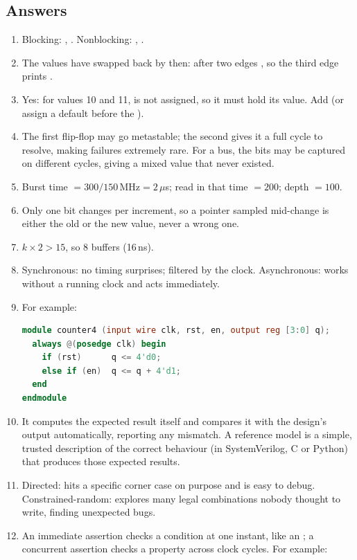 \subsection*{Answers}
\begin{enumerate}
  \item Blocking: , . Nonblocking: , .
  \item The values have swapped back by then: after two edges , so the third edge prints .
  \item Yes: for  values 10 and 11,  is not assigned, so it must hold its value. Add  (or assign  a default before the ).
  \item The first flip-flop may go metastable; the second gives it a full cycle to resolve, making failures extremely rare. For a bus, the bits may be captured on different cycles, giving a mixed value that never existed.
  \item Burst time $= 300/150\,\text{MHz} = 2\,\mu$s; read in that time $= 200$; depth $= 100$.
  \item Only one bit changes per increment, so a pointer sampled mid-change is either the old or the new value, never a wrong one.
  \item $k \times 2 > 15$, so 8 buffers (16\,ns).
  \item Synchronous: no timing surprises; filtered by the clock. Asynchronous: works without a running clock and acts immediately.
  \item For example:
\begin{lstlisting}[language=Verilog]
module counter4 (input wire clk, rst, en, output reg [3:0] q);
  always @(posedge clk) begin
    if (rst)      q <= 4'd0;
    else if (en)  q <= q + 4'd1;
  end
endmodule
\end{lstlisting}
  \item It computes the expected result itself and compares it with the design's output automatically, reporting any mismatch. A reference model is a simple, trusted description of the correct behaviour (in SystemVerilog, C or Python) that produces those expected results.
  \item Directed: hits a specific corner case on purpose and is easy to debug. Constrained-random: explores many legal combinations nobody thought to write, finding unexpected bugs.
  \item An immediate assertion checks a condition at one instant, like an ; a concurrent assertion checks a property across clock cycles. For example: 

\end{enumerate}
